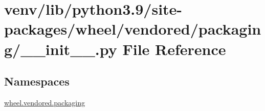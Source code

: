 \hypertarget{venv_2lib_2python3_89_2site-packages_2wheel_2vendored_2packaging_2____init_____8py}{}\section{venv/lib/python3.9/site-\/packages/wheel/vendored/packaging/\+\_\+\+\_\+init\+\_\+\+\_\+.py File Reference}
\label{venv_2lib_2python3_89_2site-packages_2wheel_2vendored_2packaging_2____init_____8py}
\subsection*{Namespaces}
\begin{DoxyCompactItemize}
\item 
 \hyperlink{namespacewheel_1_1vendored_1_1packaging}{wheel.\+vendored.\+packaging}
\end{DoxyCompactItemize}
